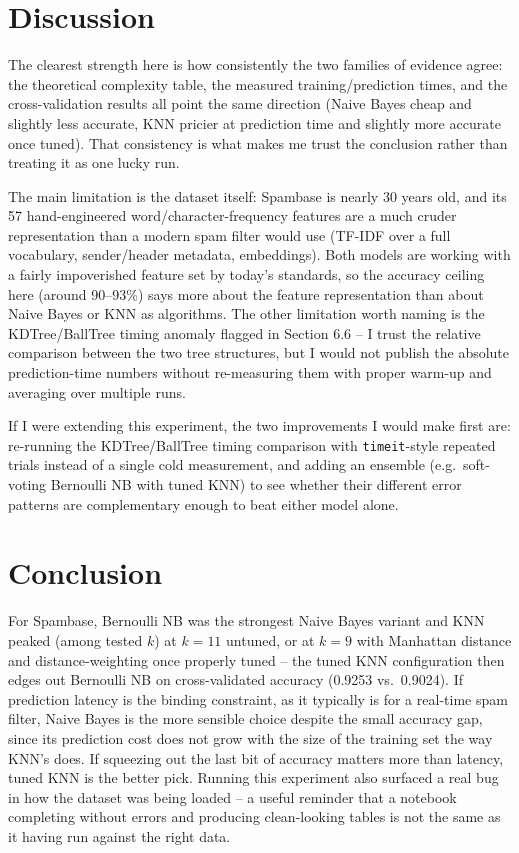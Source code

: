\documentclass[11pt,a4paper]{article}
\begin{document}
\section{Discussion}
The clearest strength here is how consistently the two families of evidence agree: the theoretical complexity table, the measured training/prediction times, and the cross-validation results all point the same direction (Naive Bayes cheap and slightly less accurate, KNN pricier at prediction time and slightly more accurate once tuned). That consistency is what makes me trust the conclusion rather than treating it as one lucky run.

The main limitation is the dataset itself: Spambase is nearly 30 years old, and its 57 hand-engineered word/character-frequency features are a much cruder representation than a modern spam filter would use (TF-IDF over a full vocabulary, sender/header metadata, embeddings). Both models are working with a fairly impoverished feature set by today's standards, so the accuracy ceiling here (around 90--93\%) says more about the feature representation than about Naive Bayes or KNN as algorithms. The other limitation worth naming is the KDTree/BallTree timing anomaly flagged in Section 6.6 -- I trust the relative comparison between the two tree structures, but I would not publish the absolute prediction-time numbers without re-measuring them with proper warm-up and averaging over multiple runs.

If I were extending this experiment, the two improvements I would make first are: re-running the KDTree/BallTree timing comparison with \texttt{timeit}-style repeated trials instead of a single cold measurement, and adding an ensemble (e.g.\ soft-voting Bernoulli NB with tuned KNN) to see whether their different error patterns are complementary enough to beat either model alone.

\section{Conclusion}
For Spambase, Bernoulli NB was the strongest Naive Bayes variant and KNN peaked (among tested $k$) at $k{=}11$ untuned, or at $k{=}9$ with Manhattan distance and distance-weighting once properly tuned -- the tuned KNN configuration then edges out Bernoulli NB on cross-validated accuracy (0.9253 vs.\ 0.9024). If prediction latency is the binding constraint, as it typically is for a real-time spam filter, Naive Bayes is the more sensible choice despite the small accuracy gap, since its prediction cost does not grow with the size of the training set the way KNN's does. If squeezing out the last bit of accuracy matters more than latency, tuned KNN is the better pick. Running this experiment also surfaced a real bug in how the dataset was being loaded -- a useful reminder that a notebook completing without errors and producing clean-looking tables is not the same as it having run against the right data.
\end{document}

